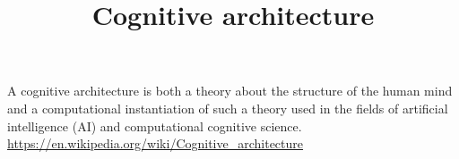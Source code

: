 \documentclass[a4paper]{article}
\title{Cognitive architecture}
\date{}
\begin{document}
\maketitle
    A cognitive architecture is both a theory about the structure of the human mind and a computational instantiation of such a theory used in the fields of artificial intelligence (AI) and computational cognitive science. \url{https://en.wikipedia.org/wiki/Cognitive_architecture}
    
    
\end{document}
